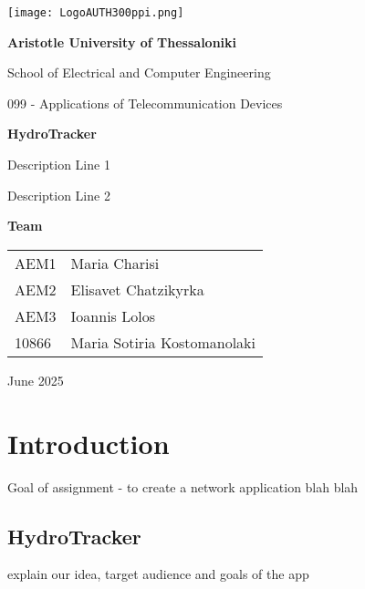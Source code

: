 \documentclass{article}
\begin{document}
\begin{titlepage}
    \centering
    \texttt{[image: LogoAUTH300ppi.png]}
    \par\vspace{2cm}

    {\Large \textbf{Aristotle University of Thessaloniki} \par}
    \vspace{0.5cm}
    {\large School of Electrical and Computer Engineering\par}
    {\large 099 - Applications of Telecommunication Devices\par}
    \vspace{3cm}

    {\Large \textbf{HydroTracker} \par}
    {\large Description Line 1 \par}
    {\large Description Line 2 \par}
    \vspace{3cm}

    {\large \textbf{Team} \par}
    \vspace{0.5cm}
    \begin{tabular}{ll}
    AEM1 & Maria Charisi \\
    AEM2 & Elisavet Chatzikyrka \\
    AEM3 & Ioannis Lolos\\
    10866 & Maria Sotiria Kostomanolaki \\
    \end{tabular}
    \par\vspace{3cm}

    {\large June 2025 \par}
\end{titlepage}

\tableofcontents %

\newpage %

\section{Introduction}\label{sec:example}
Goal of assignment - to create a network application blah blah

\subsection{HydroTracker}
explain our idea, target audience and goals of the app
\end{document}
